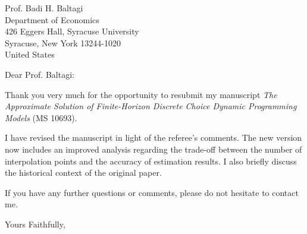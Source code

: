 \documentclass[13pt]{letter}
\begin{document}
\begin{letter}{Prof. Badi H. Baltagi \\Department of Economics \\
426 Eggers Hall, Syracuse University \\
Syracuse, New York 13244-1020\\
United States }

\opening{Dear Prof. Baltagi:}

Thank you very much for the opportunity to resubmit my manuscript \textit{The Approximate Solution of Finite-Horizon Discrete Choice Dynamic Programming Models} (MS 10693).

I have revised the manuscript in light of the referee's comments. The new version now includes an improved analysis regarding the trade-off between the number of interpolation points and the accuracy of estimation results. I also briefly discuss the historical context of the original paper.

If you have any further questions or comments, please do not hesitate to contact me.\newline

\closing{Yours Faithfully,}\vspace{0.5cm}

\end{letter}
\end{document}
